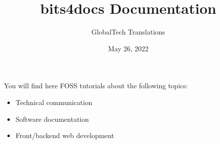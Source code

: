 \documentclass[a4paper,10pt,english,openany,oneside]{sphinxmanual}
\title{bits4docs Documentation}
\date{May 26, 2022}
\author{GlobalTech Translations}
\begin{document}
\pagestyle{empty}
\sphinxmaketitle
\pagestyle{plain}
\sphinxtableofcontents
\pagestyle{normal}
\label{\detokenize{index::doc}}


\sphinxAtStartPar
You will find here FOSS tutorials about the following topics:
\begin{itemize}
\item {} 
\sphinxAtStartPar
Technical communication

\item {} 
\sphinxAtStartPar
Software documentation

\item {} 
\sphinxAtStartPar
Front/backend web development

\end{itemize}

\sphinxAtStartPar
{}
\end{document}
